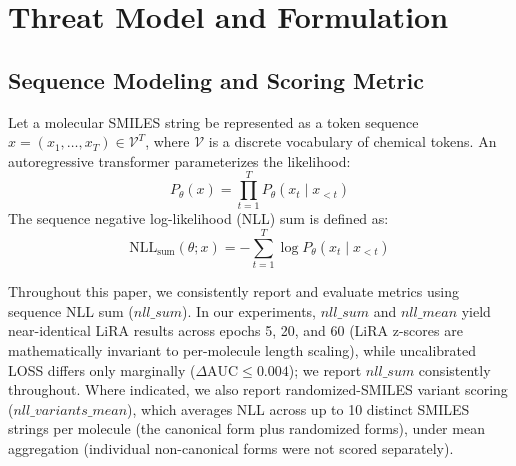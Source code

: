 \documentclass[10pt,journal,compsoc]{IEEEtran}
\begin{document}
\section{Threat Model and Formulation}
\subsection{Sequence Modeling and Scoring Metric}
Let a molecular SMILES string be represented as a token sequence $x = (x_1, \dots, x_T) \in \mathcal{V}^T$, where $\mathcal{V}$ is a discrete vocabulary of chemical tokens. An autoregressive transformer parameterizes the likelihood:
\begin{equation}
P_\theta(x) = \prod_{t=1}^T P_\theta(x_t \mid x_{<t})
\end{equation}
The sequence negative log-likelihood (NLL) sum is defined as:
\begin{equation}
\text{NLL}_{\text{sum}}(\theta; x) = - \sum_{t=1}^T \log P_\theta(x_t \mid x_{<t})
\end{equation}

Throughout this paper, we consistently report and evaluate metrics using sequence NLL sum ($nll\_sum$). In our experiments, $nll\_sum$ and $nll\_mean$ yield near-identical LiRA results across epochs 5, 20, and 60 (LiRA z-scores are mathematically invariant to per-molecule length scaling), while uncalibrated LOSS differs only marginally ($\Delta \text{AUC} \le 0.004$); we report $nll\_sum$ consistently throughout. Where indicated, we also report randomized-SMILES variant scoring ($nll\_variants\_mean$), which averages NLL across up to 10 distinct SMILES strings per molecule (the canonical form plus randomized forms), under mean aggregation (individual non-canonical forms were not scored separately).
\end{document}
